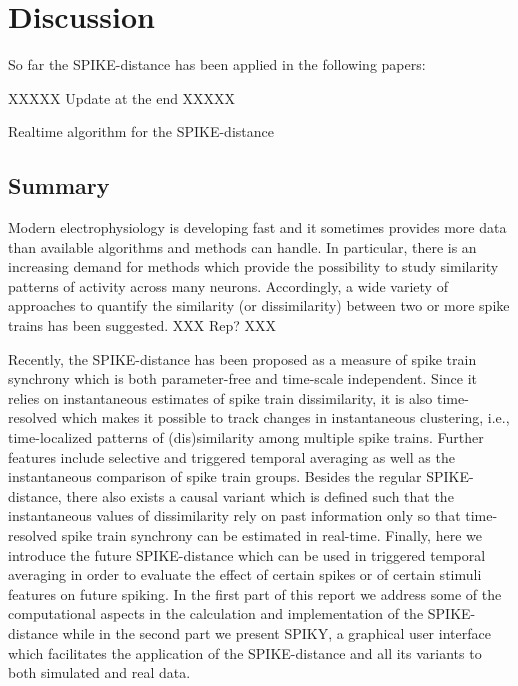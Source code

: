 \documentclass[10pt,twocolumn]{elsart5p}
\begin{document}
%
%
%
%
\section{\label{s:Discussion} Discussion}

So far the SPIKE-distance has been applied in the following papers:

\citep{Papoutsi13, DiPoppa13, Rusu14, Sacre14}

XXXXX Update at the end XXXXX

Realtime algorithm for the SPIKE-distance

\subsection{\label{ss:Summary} Summary}

Modern electrophysiology is developing fast and it sometimes provides more data than available algorithms and methods can handle. In particular, there is an increasing demand for methods which provide the possibility to study similarity patterns of activity across many neurons. Accordingly, a wide variety of approaches to quantify the similarity (or dissimilarity) between two or more spike trains has been suggested. XXX Rep? XXX

Recently, the SPIKE-distance has been proposed as a measure of spike train synchrony which is both parameter-free and time-scale independent. Since it relies on instantaneous estimates of spike train dissimilarity, it is also time-resolved which makes it possible to track changes in instantaneous clustering, i.e., time-localized patterns of (dis)similarity among multiple spike trains. Further features include selective and triggered temporal averaging as well as the instantaneous comparison of spike train groups. Besides the regular SPIKE-distance, there also exists a causal variant which is defined such that the instantaneous values of dissimilarity rely on past information only so that time-resolved spike train synchrony can be estimated in real-time. Finally, here we introduce the future SPIKE-distance which can be used in triggered temporal averaging in order to evaluate the effect of certain spikes or of certain stimuli features on future spiking. In the first part of this report we address some of the computational aspects in the calculation and implementation of the SPIKE-distance while in the second part we present SPIKY, a graphical user interface which facilitates the application of the SPIKE-distance and all its variants to both simulated and real data.
\end{document}
